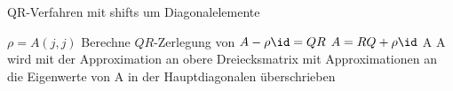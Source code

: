 \documentclass{article}
\begin{document}
\begin{algorithm}
  \caption{QR-Verfahren mit shifts um Diagonalelemente}
  \begin{algorithmic}[1]
            \State $\rho = A(j,j)$
            \State Berechne $QR$-Zerlegung von $A-\rho \id = QR$
            \State $A = RQ + \rho \id$
          \EndWhile
        \EndFor
        \State \Return A
        \State \Comment A wird mit der Approximation an obere Dreiecksmatrix mit Approximationen an die Eigenwerte von A in der Hauptdiagonalen überschrieben
  \end{algorithmic}
\end{algorithm}
\end{document}
